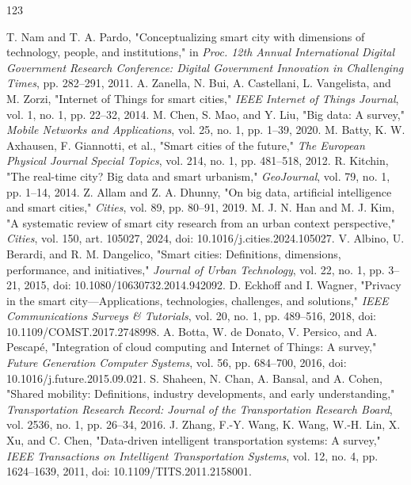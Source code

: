 \documentclass[journal]{IEEEtran}
\begin{document}
\begin{thebibliography}{123}

 T. Nam and T. A. Pardo, "Conceptualizing smart city with dimensions of technology, people, and institutions," in \emph{Proc. 12th Annual International Digital Government Research Conference: Digital Government Innovation in Challenging Times}, pp. 282--291, 2011.
 A. Zanella, N. Bui, A. Castellani, L. Vangelista, and M. Zorzi, "Internet of Things for smart cities," \emph{IEEE Internet of Things Journal}, vol. 1, no. 1, pp. 22--32, 2014.
 M. Chen, S. Mao, and Y. Liu, "Big data: A survey," \emph{Mobile Networks and Applications}, vol. 25, no. 1, pp. 1--39, 2020.
 M. Batty, K. W. Axhausen, F. Giannotti, et al., "Smart cities of the future," \emph{The European Physical Journal Special Topics}, vol. 214, no. 1, pp. 481--518, 2012.
 R. Kitchin, "The real-time city? Big data and smart urbanism," \emph{GeoJournal}, vol. 79, no. 1, pp. 1--14, 2014.
 Z. Allam and Z. A. Dhunny, "On big data, artificial intelligence and smart cities," \emph{Cities}, vol. 89, pp. 80--91, 2019.
 M. J. N. Han and M. J. Kim, "A systematic review of smart city research from an urban context perspective," \emph{Cities}, vol. 150, art. 105027, 2024, doi: 10.1016/j.cities.2024.105027.
 V. Albino, U. Berardi, and R. M. Dangelico, "Smart cities: Definitions, dimensions, performance, and initiatives," \emph{Journal of Urban Technology}, vol. 22, no. 1, pp. 3--21, 2015, doi: 10.1080/10630732.2014.942092.
 D. Eckhoff and I. Wagner, "Privacy in the smart city---Applications, technologies, challenges, and solutions," \emph{IEEE Communications Surveys \& Tutorials}, vol. 20, no. 1, pp. 489--516, 2018, doi: 10.1109/COMST.2017.2748998.
 A. Botta, W. de Donato, V. Persico, and A. Pescap\'e, "Integration of cloud computing and Internet of Things: A survey," \emph{Future Generation Computer Systems}, vol. 56, pp. 684--700, 2016, doi: 10.1016/j.future.2015.09.021.
 S. Shaheen, N. Chan, A. Bansal, and A. Cohen, "Shared mobility: Definitions, industry developments, and early understanding," \emph{Transportation Research Record: Journal of the Transportation Research Board}, vol. 2536, no. 1, pp. 26--34, 2016.
 J. Zhang, F.-Y. Wang, K. Wang, W.-H. Lin, X. Xu, and C. Chen, "Data-driven intelligent transportation systems: A survey," \emph{IEEE Transactions on Intelligent Transportation Systems}, vol. 12, no. 4, pp. 1624--1639, 2011, doi: 10.1109/TITS.2011.2158001.

\end{thebibliography}
\end{document}
